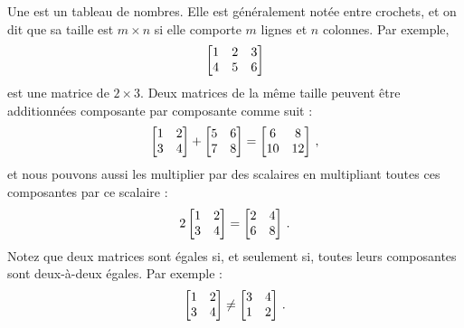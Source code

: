 
\begin{definition}
Une  est un tableau de nombres. Elle est généralement notée entre crochets, et
on dit que sa taille est $m \times n$ si elle comporte $m$ lignes et
$n$ colonnes.  Par exemple, 
$$\left[ \begin{matrix} 1 & 2 & 3 \\ 4 & 5 & 6 \end{matrix} \right]$$
est une matrice de $2 \times 3$.
Deux matrices de la même taille peuvent être additionnées composante par composante comme suit :
$$
\left[ \begin{matrix} 1 & 2 \\ 3 & 4 \end{matrix} \right] + \left[ \begin{matrix} 5 & 6 \\ 7 & 8 \end{matrix} \right] = \left[ \begin{matrix} 6 & 8 \\ 10 & 12 \end{matrix} \right]\,,
$$
et nous pouvons aussi les multiplier par des scalaires en multipliant toutes ces composantes par ce scalaire :
$$
2\left[ \begin{matrix} 1 & 2 \\ 3 & 4 \end{matrix} \right] = \left[ \begin{matrix} 2 & 4 \\ 6 & 8 \end{matrix} \right]\,.
$$
Notez que deux matrices sont égales si, et seulement si, toutes leurs composantes sont deux-à-deux égales. Par exemple :
$$
\left[ \begin{matrix} 1 & 2 \\ 3 & 4 \end{matrix} \right] \neq \left[ \begin{matrix}  3 & 4 \\1 & 2 \end{matrix} \right] \,.
$$ 
\end{definition}









